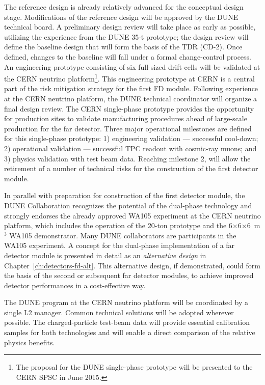The reference design is already relatively advanced for  the 
conceptual design
stage. Modifications of the reference design will
be approved by the DUNE technical board. A preliminary design
review will take place as early as possible, utilizing the experience
from the DUNE 35-t prototype; the design review will define the
baseline design that will form the basis of the TDR (CD-2).  Once
defined, changes to the baseline will fall under a formal
change-control process. An engineering prototype consisting of
six full-sized drift cells will be validated at the CERN neutrino
platform\footnote{The proposal for the DUNE single-phase prototype
  will be presented to the CERN SPSC in June 2015.}.  This engineering
prototype at CERN is a central part of the risk mitigation strategy
for the first  FD module. Following experience at the CERN
neutrino platform, the DUNE technical coordinator will organize a
final design review. The CERN single-phase prototype provides the opportunity for
production sites to validate manufacturing procedures ahead of
large-scale production for the far detector. Three major operational
milestones are defined for this single-phase prototype: 1) engineering
validation --- successful cool-down; 2) operational validation ---
successful TPC readout with cosmic-ray muons; and 3) physics
validation with test beam data. Reaching milestone 2, will allow the
retirement of a number of technical risks for the construction of the
first  detector module.

In parallel with preparation for construction of the first 
detector module, the DUNE Collaboration recognizes the potential of
the dual-phase technology and strongly endorses the already
approved WA105 experiment
 at the CERN neutrino platform, which
includes the operation of the 20-ton prototype and the
6$\times$6$\times$6~m$^3$ WA105 demonstrator. 
Many DUNE collaborators are participants in the WA105
experiment. A concept for the dual-phase implementation of a far detector module
is presented in detail as an \textit{alternative design} in
Chapter~\ref{ch:detectors-fd-alt}. This alternative design, if
demonstrated, could form the basis of the second or subsequent 
far detector modules, to achieve improved detector performances in a
cost-effective way.

The DUNE program at the CERN neutrino platform will be coordinated by
a single L2 manager. Common technical solutions will be adopted
wherever possible.  The charged-particle test-beam data will provide
essential calibration samples for both technologies and will enable a
direct comparison of the relative physics benefits.

